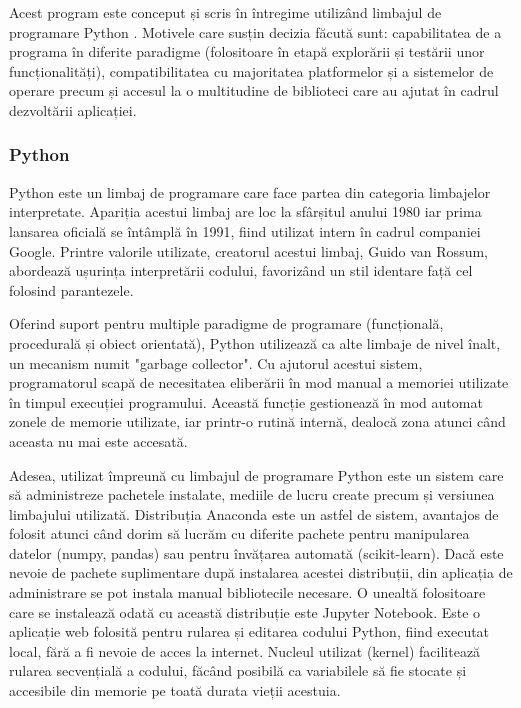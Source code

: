 \documentclass[a4paper, 12pt]{report}
\begin{document}
	Acest program este conceput și scris în întregime utilizând limbajul de programare Python \cite{python}. Motivele care susțin decizia făcută sunt: capabilitatea de a programa în diferite paradigme (folositoare în etapă explorării și testării unor funcționalități), compatibilitatea cu majoritatea platformelor și a sistemelor de operare precum și accesul la o multitudine de biblioteci care au ajutat în cadrul dezvoltării aplicației.
	
	\clearpage
	\subsubsection{Python}
	Python este un limbaj de programare care face partea din categoria limbajelor interpretate. Apariția acestui limbaj are loc la sfârșitul anului 1980 iar prima lansarea oficială se întâmplă în 1991, fiind utilizat intern în cadrul companiei Google. Printre valorile utilizate, creatorul acestui limbaj, Guido van Rossum, abordează ușurința interpretării codului, favorizând un stil identare față cel folosind parantezele.

	Oferind suport pentru multiple paradigme de programare (funcțională, procedurală și obiect orientată), Python utilizează ca alte limbaje de nivel înalt, un mecanism numit "garbage collector". Cu ajutorul acestui sistem, programatorul scapă de necesitatea eliberării în mod manual a memoriei utilizate în timpul execuției programului. Această funcție gestionează în mod automat zonele de memorie utilizate, iar printr-o rutină internă, dealocă zona atunci când aceasta nu mai este accesată. 

	Adesea, utilizat împreună cu limbajul de programare Python este un sistem care să administreze pachetele instalate, mediile de lucru create precum și versiunea limbajului utilizată. Distribuția Anaconda \cite{anaconda} este un astfel de sistem, avantajos de folosit atunci când dorim să lucrăm cu diferite pachete pentru manipularea datelor (numpy, pandas) sau pentru învățarea automată (scikit-learn). Dacă este nevoie de pachete suplimentare după instalarea acestei distribuții, din aplicația de administrare se pot instala manual bibliotecile necesare. O unealtă folositoare care se instalează odată cu această distribuție este Jupyter Notebook. Este o aplicație web folosită pentru rularea și editarea codului Python, fiind executat local, fără a fi nevoie de acces la internet. Nucleul utilizat (kernel) facilitează rularea secvențială a codului, făcând posibilă ca variabilele să fie stocate și accesibile din memorie pe toată durata vieții acestuia. 
	
\end{document}

